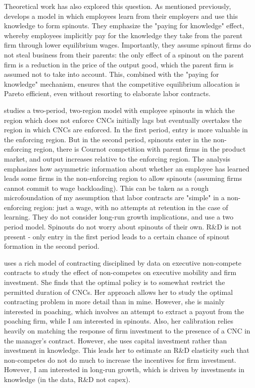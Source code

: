 \documentclass[11pt,english]{article}
\theoremstyle{remark}
\begin{document}
Theoretical work has also explored this question. As mentioned previously, \cite{franco_spin-outs:_2006} develops a model in which employees learn from their employers and use this knowledge to form spinouts. They emphasize the "paying for knowledge" effect, whereby employees implicitly pay for the knowledge they take from the parent firm through lower equilibrium wages. Importantly, they assume spinout firms do not steal business from their parents: the only effect of a spinout on the parent firm is a reduction in the price of the output good, which the parent firm is assumed not to take into account. This, combined with the "paying for knowledge" mechanism, ensures that the competitive equilibrium allocation is Pareto efficient, even without resorting to elaborate labor contracts.

\cite{franco_covenants_2008} studies a two-period, two-region model with employee spinouts in which the region which does not enforce CNCs initially lags but eventually overtakes the region in which CNCs are enforced. In the first period, entry is more valuable in the enforcing region. But in the second period, spinouts enter in the non-enforcing region, there is Cournot competition with parent firms in the product market, and output increases relative to the enforcing region. The analysis emphasizes how asymmetric information about whether an employee has learned leads some firms in the non-enforcing region to allow spinouts (assuming firms cannot commit to wage backloading). This can be taken as a rough microfoundation of my assumption that labor contracts are "simple" in  a non-enforcing region: just a wage, with no attempts at retention in the case of learning. They do not consider long-run growth implications, and use a two period model. Spinouts do not worry about spinouts of their own. R\&D is not present - only entry in the first period leads to a certain chance of spinout formation in the second period. 

\cite{shi_restrictions_2018} uses a rich model of contracting disciplined by data on executive non-compete contracts to study the effect of non-competes on executive mobility and firm investment. She finds that the optimal policy is to somewhat restrict the permitted duration of CNCs. Her approach allows her to study the optimal contracting problem in more detail than in mine. However, she is mainly interested in poaching, which involves an attempt to extract a payout from the poaching firm, while I am interested in spinouts. Also, her calibration relies heavily on matching the response of firm investment to the presence of a CNC in the manager's contract. However, she uses capital investment rather than investment in knowledge. This leads her to estimate an R\&D elasticity such that non-competes do not do much to increase the incentives for firm investment. However, I am interested in long-run growth, which is driven by investments in knowledge (in the data, R\&D not capex).
\end{document}
